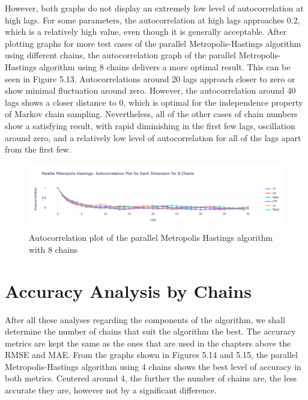 However, both graphs do not display an extremely low level of autocorrelation at high lags. For some parameters, the autocorrelation at high lags approaches $0.2$, which is a relatively high value, even though it is generally acceptable. After plotting graphs for more test cases of the parallel Metropolis-Hastings algorithm using different chains, the autocorrelation graph of the parallel Metropolis-Hastings algorithm using 8 chains delivers a more optimal result. This can be seen in Figure 5.13. Autocorrelations around 20 lags approach closer to zero or show minimal fluctuation around zero. However, the autocorrelation around 40 lags shows a closer distance to 0, which is optimal for the independence property of Markov chain sampling. Nevertheless, all of the other cases of chain numbers show a satisfying result, with rapid diminishing in the first few lags, oscillation around zero, and a relatively low level of autocorrelation for all of the lags apart from the first few.


\begin{figure}[H]
    \centering
    \includegraphics[width=1\textwidth]{figures/parallel_mh/Autocorrelation_8.png}
    \captionsetup{width=.8\textwidth}
    \caption{Autocorrelation plot of the parallel Metropolis Hastings algorithm with 8 chains}
    \label{fig:enter-label}
\end{figure}


\section{Accuracy Analysis by Chains}
After all these analyses regarding the components of the algorithm, we shall determine the number of chains that suit the algorithm the best. The accuracy metrics are kept the same as the ones that are used in the chapters above the RMSE and MAE. From the graphs shown in Figures 5.14 and 5.15, the parallel Metropolis-Hastings algorithm using 4 chains shows the best level of accuracy in both metrics. Centered around 4, the further the number of chains are, the less accurate they are, however not by a significant difference.

